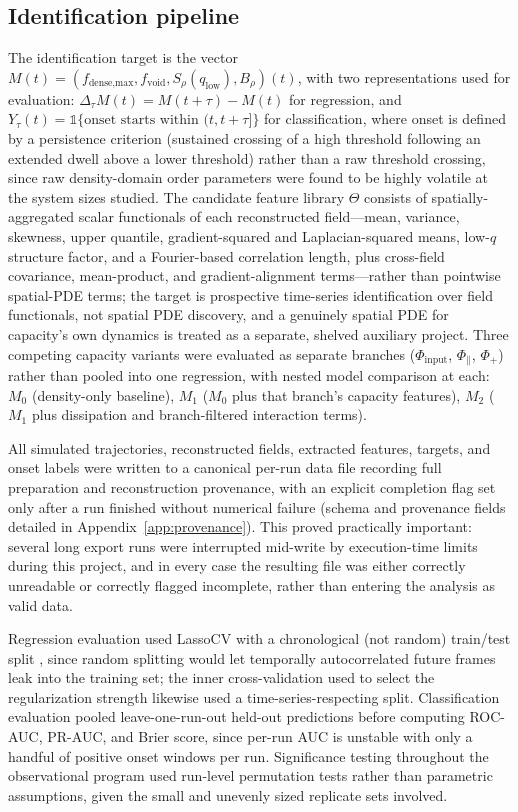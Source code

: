 \documentclass[11pt]{article}
\begin{document}
\subsection{Identification pipeline}

The identification target is the vector $M(t) = (f_{\text{dense,max}}, f_{\text{void}}, S_{\rho}(q_{\text{low}}), B_{\rho})(t)$, with two representations used for evaluation: $\Delta_\tau M(t) = M(t+\tau)-M(t)$ for regression, and $Y_\tau(t) = \mathbb{1}\{\text{onset starts within }(t,t+\tau]\}$ for classification, where onset is defined by a persistence criterion (sustained crossing of a high threshold following an extended dwell above a lower threshold) rather than a raw threshold crossing, since raw density-domain order parameters were found to be highly volatile at the system sizes studied. The candidate feature library $\Theta$ consists of spatially-aggregated scalar functionals of each reconstructed field---mean, variance, skewness, upper quantile, gradient-squared and Laplacian-squared means, low-$q$ structure factor, and a Fourier-based correlation length, plus cross-field covariance, mean-product, and gradient-alignment terms---rather than pointwise spatial-PDE terms; the target is prospective time-series identification over field functionals, not spatial PDE discovery, and a genuinely spatial PDE for capacity's own dynamics is treated as a separate, shelved auxiliary project. Three competing capacity variants were evaluated as separate branches ($\Phi_{\text{input}}$, $\Phi_{\parallel}$, $\Phi_{+}$) rather than pooled into one regression, with nested model comparison at each: $M_0$ (density-only baseline), $M_1$ ($M_0$ plus that branch's capacity features), $M_2$ ($M_1$ plus dissipation and branch-filtered interaction terms).

All simulated trajectories, reconstructed fields, extracted features, targets, and onset labels were written to a canonical per-run data file recording full preparation and reconstruction provenance, with an explicit completion flag set only after a run finished without numerical failure (schema and provenance fields detailed in Appendix~\ref{app:provenance}). This proved practically important: several long export runs were interrupted mid-write by execution-time limits during this project, and in every case the resulting file was either correctly unreadable or correctly flagged incomplete, rather than entering the analysis as valid data.

Regression evaluation used LassoCV \cite{Tibshirani1996} with a chronological (not random) train/test split \cite{Hyndman2018}, since random splitting would let temporally autocorrelated future frames leak into the training set; the inner cross-validation used to select the regularization strength likewise used a time-series-respecting split. Classification evaluation pooled leave-one-run-out held-out predictions before computing ROC-AUC, PR-AUC, and Brier score, since per-run AUC is unstable with only a handful of positive onset windows per run. Significance testing throughout the observational program used run-level permutation tests \cite{Good2005} rather than parametric assumptions, given the small and unevenly sized replicate sets involved.
\end{document}
